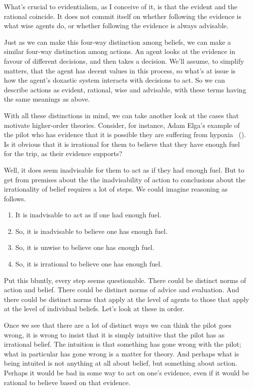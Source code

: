 \documentclass[
  10pt,
  letterpaper,
  twoside]{scrbook}
\providecommand{\tightlist}{%
  \setlength{\itemsep}{0pt}\setlength{\parskip}{0pt}}\usepackage{longtable,booktabs,array}
\begin{document}
What's crucial to evidentialism, as I conceive of it, is that the
evident and the rational coincide. It does not commit itself on whether
following the evidence is what wise agents do, or whether following the
evidence is always advisable.

Just as we can make this four-way distinction among beliefs, we can make
a similar four-way distinction among actions. An agent looks at the
evidence in favour of different decisions, and then takes a decision.
We'll assume, to simplify matters, that the agent has decent values in
this process, so what's at issue is how the agent's doxastic system
interacts with decisions to act. So we can describe actions as evident,
rational, wise and advisable, with these terms having the same meanings
as above.

With all these distinctions in mind, we can take another look at the
cases that motivate higher-order theories. Consider, for instance, Adam
Elga's example of the pilot who has evidence that it is possible they
are suffering from hypoxia ~(). Is it
obvious that it is irrational for them to believe that they have enough
fuel for the trip, as their evidence supports?

Well, it does seem inadvisable for them to act as if they had enough
fuel. But to get from premises about the the inadvisability of action to
conclusions about the irrationality of belief requires a lot of steps.
We could imagine reasoning as follows.

\begin{enumerate}
\def\labelenumi{\arabic{enumi}.}
\tightlist
\item
  It is inadvisable to act as if one had enough fuel.
\item
  So, it is inadvisable to believe one has enough fuel.
\item
  So, it is unwise to believe one has enough fuel.
\item
  So, it is irrational to believe one has enough fuel.
\end{enumerate}

Put this bluntly, every step seems questionable. There could be distinct
norms of action and belief. There could be distinct norms of advice and
evaluation. And there could be distinct norms that apply at the level of
agents to those that apply at the level of individual beliefs. Let's
look at these in order.

Once we see that there are a lot of distinct ways we can think the pilot
goes wrong, it is wrong to insist that it is simply intuitive that the
pilot has as irrational belief. The intuition is that something has gone
wrong with the pilot; what in particular has gone wrong is a matter for
theory. And perhaps what is being intuited is not anything at all about
belief, but something about action. Perhaps it would be bad in some way
to act on one's evidence, even if it would be rational to believe based
on that evidence.
\end{document}
